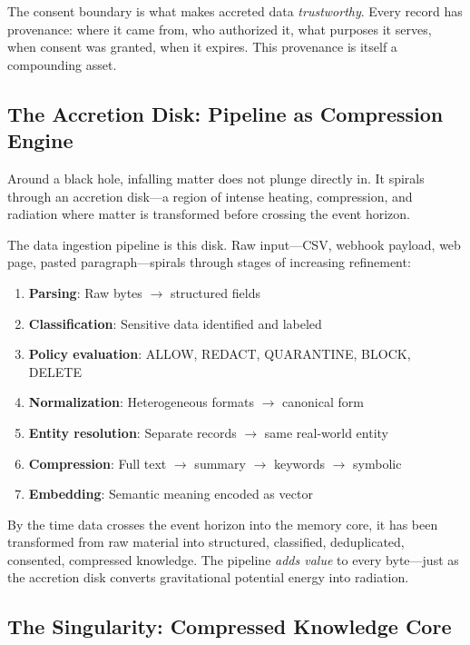 \documentclass[11pt,twocolumn]{article}
\begin{document}
The consent boundary is what makes accreted data \emph{trustworthy}. Every record has provenance: where it came from, who authorized it, what purposes it serves, when consent was granted, when it expires. This provenance is itself a compounding asset.

\subsection{The Accretion Disk: Pipeline as Compression Engine}

Around a black hole, infalling matter does not plunge directly in. It spirals through an accretion disk---a region of intense heating, compression, and radiation where matter is transformed before crossing the event horizon.

The data ingestion pipeline is this disk. Raw input---CSV, webhook payload, web page, pasted paragraph---spirals through stages of increasing refinement:

\begin{enumerate}[nosep,leftmargin=1.5em]
  \item \textbf{Parsing}: Raw bytes $\rightarrow$ structured fields
  \item \textbf{Classification}: Sensitive data identified and labeled
  \item \textbf{Policy evaluation}: ALLOW, REDACT, QUARANTINE, BLOCK, DELETE
  \item \textbf{Normalization}: Heterogeneous formats $\rightarrow$ canonical form
  \item \textbf{Entity resolution}: Separate records $\rightarrow$ same real-world entity
  \item \textbf{Compression}: Full text $\rightarrow$ summary $\rightarrow$ keywords $\rightarrow$ symbolic
  \item \textbf{Embedding}: Semantic meaning encoded as vector
\end{enumerate}

By the time data crosses the event horizon into the memory core, it has been transformed from raw material into structured, classified, deduplicated, consented, compressed knowledge. The pipeline \emph{adds value} to every byte---just as the accretion disk converts gravitational potential energy into radiation.

\subsection{The Singularity: Compressed Knowledge Core}
\end{document}

